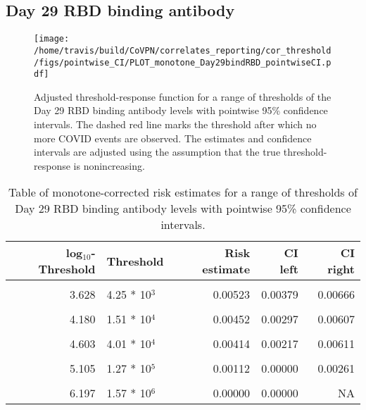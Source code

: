 \documentclass[]{book}
\theoremstyle{definition}
\theoremstyle{definition}
\theoremstyle{definition}
\newcommand{\1}{\mathbbm{1}}
\begin{document}
\clearpage

\clearpage

\clearpage

\hypertarget{day-29-rbd-binding-antibody-1}{%
\subsection{Day 29 RBD binding antibody}\label{day-29-rbd-binding-antibody-1}}

\begin{figure}[H]
\centering
\texttt{[image: /home/travis/build/CoVPN/correlates\_reporting/cor\_threshold/figs/pointwise\_CI/PLOT\_monotone\_Day29bindRBD\_pointwiseCI.pdf]}
\caption{Adjusted threshold-response function for a range of thresholds of the
  Day 29 RBD binding antibody levels with pointwise 95\% confidence intervals. The dashed red line marks the threshold after which no more COVID events are observed. The estimates and confidence intervals are adjusted using the assumption that the true threshold-response is nonincreasing.}
\end{figure}
\begin{table}[!h]

\caption{\label{tab:unnamed-chunk-373}Table of monotone-corrected risk estimates for a range of thresholds of Day 29 RBD binding antibody levels with pointwise 95\% confidence intervals.}
\centering
\begin{tabular}[t]{rlrrr}
\toprule
log$_{10}$-Threshold & Threshold & Risk estimate & CI left & CI right\\
\midrule
\cellcolor{gray!6}{2.882} & \cellcolor{gray!6}{7.62 * 10$^2$} & \cellcolor{gray!6}{0.00576} & \cellcolor{gray!6}{0.00435} & \cellcolor{gray!6}{0.00718}\\
3.628 & 4.25 * 10$^3$ & 0.00523 & 0.00379 & 0.00666\\
\cellcolor{gray!6}{3.889} & \cellcolor{gray!6}{7.74 * 10$^3$} & \cellcolor{gray!6}{0.00459} & \cellcolor{gray!6}{0.00316} & \cellcolor{gray!6}{0.00602}\\
4.180 & 1.51 * 10$^4$ & 0.00452 & 0.00297 & 0.00607\\
\cellcolor{gray!6}{4.395} & \cellcolor{gray!6}{2.48 * 10$^4$} & \cellcolor{gray!6}{0.00452} & \cellcolor{gray!6}{0.00264} & \cellcolor{gray!6}{0.00640}\\
4.603 & 4.01 * 10$^4$ & 0.00414 & 0.00217 & 0.00611\\
\cellcolor{gray!6}{4.826} & \cellcolor{gray!6}{6.70 * 10$^4$} & \cellcolor{gray!6}{0.00365} & \cellcolor{gray!6}{0.00148} & \cellcolor{gray!6}{0.00583}\\
5.105 & 1.27 * 10$^5$ & 0.00112 & 0.00000 & 0.00261\\
\cellcolor{gray!6}{5.422} & \cellcolor{gray!6}{2.64 * 10$^5$} & \cellcolor{gray!6}{0.00112} & \cellcolor{gray!6}{0.00000} & \cellcolor{gray!6}{0.00314}\\
6.197 & 1.57 * 10$^6$ & 0.00000 & 0.00000 & NA\\
\bottomrule
\end{tabular}
\end{table}
\end{document}
